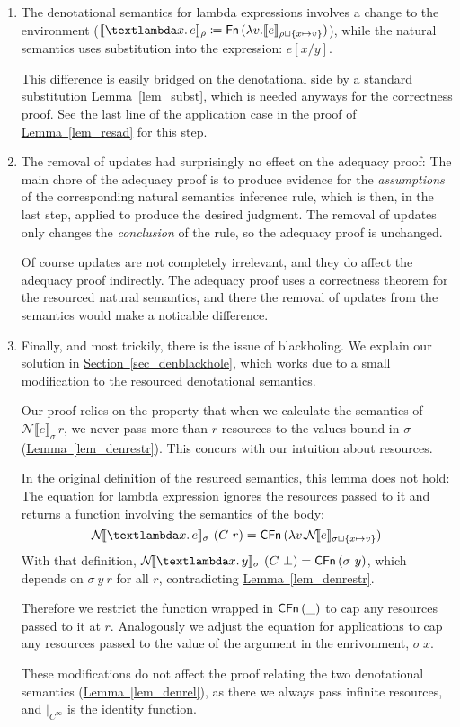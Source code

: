 \documentclass{jfp1}
\newcommand{\myref}[2]{\hyperref[#2]{#1~\ref*{#2}}}
\theoremstyle{nonumberbreak}
\newcommand{\sFn}[1]{\text{\textsf{Fn}}\,(#1)}
\newcommand{\sCFn}[1]{\text{\textsf{CFn}}\,(#1)}
\newcommand{\sLam}[2]{\text{\textlambda} #1.\, #2}
\newcommand{\dsem}[2]{\llbracket #1 \rrbracket_{#2}}
\newcommand{\dsemr}[2]{\mathcal N\!\llbracket #1 \rrbracket_{#2}}
\begin{document}
\begin{enumerate}
\item The denotational semantics for lambda expressions involves a change to the environment ($\dsem{\sLam x e}\rho \coloneqq \sFn{\lambda v. \dsem e {\rho \sqcup \{x \mapsto v\}}}$), while the natural semantics uses substitution into the expression: $e[x/y]$.

This difference is easily bridged on the denotational side by a standard substitution \myref{Lemma}{lem_subst}, which is needed anyways for the correctness proof. See the last line of the application case in the proof of \myref{Lemma}{lem_resad} for this step.

\item The removal of updates had surprisingly no effect on the adequacy proof: The main chore of the adequacy proof is to produce evidence for the \emph{assumptions} of the corresponding natural semantics inference rule, which is then, in the last step, applied to produce the desired judgment. The removal of updates only changes the \emph{conclusion} of the rule, so the adequacy proof is unchanged.

Of course updates are not completely irrelevant, and they do affect the adequacy proof indirectly. The adequacy proof uses a correctness theorem for the resourced natural semantics, and there the removal of updates from the semantics would make a noticable difference.

\item Finally, and most trickily, there is the issue of blackholing. We explain our solution in \myref{Section}{sec_denblackhole}, which works due to a small modification to the resourced denotational semantics.

Our proof relies on the property that when we calculate the semantics of $\dsemr{e}\sigma\,r$, we never pass more than $r$ resources to the values bound in $\sigma$ (\myref{Lemma}{lem_denrestr}). This concurs with our intuition about resources.

In the original definition of the resurced semantics, this lemma does not hold: The equation for lambda expression ignores the resources passed to it and returns a function involving the semantics of the body:
\[
\dsemr{\sLam x e}\sigma ~ (C~r) = \sCFn{\lambda v. \dsemr e {\sigma \sqcup \{x \mapsto v\}}}
\]
With that definition, $\dsemr{\sLam x y}\sigma~(C~\bot) = \sCFn{\sigma~y}$, which depends on $\sigma~y~r$ for all $r$, contradicting \myref{Lemma}{lem_denrestr}.

Therefore we restrict the function wrapped in $\sCFn \_$ to cap any resources passed to it at $r$. Analogously we adjust the equation for applications to cap any resources passed to the value of the argument in the enrivonment, $\sigma~x$.

These modifications do not affect the proof relating the two denotational semantics (\myref{Lemma}{lem_denrel}), as there we always pass infinite resources, and $|_{C^\infty}$ is the identity function.

\end{enumerate}
\end{document}
